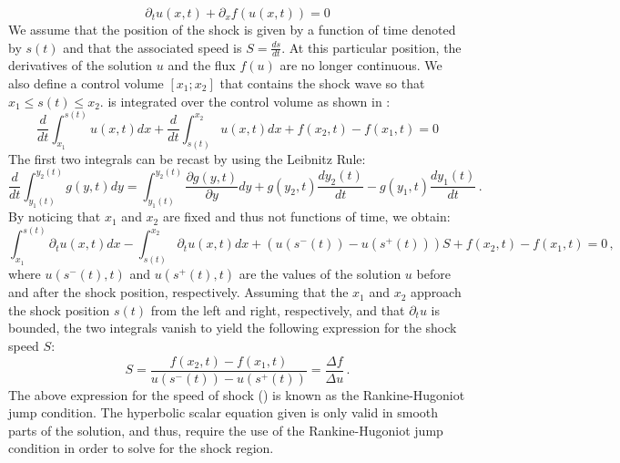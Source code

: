 %
\begin{equation}\label{eq:rh_sct1b}
\partial_t u(x,t) + \partial_x f(u(x,t)) = 0
\end{equation}
%
We assume that the position of the shock is given by a function of time denoted by $s(t)$ and that the associated speed is $S = \frac{ds}{dt}$. At this particular position, the derivatives of the solution $u$ and the flux $f(u)$ are no longer continuous. We also define a control volume $\left[ x_1; x_2 \right]$ that contains the shock wave so that $x_1 \leq s(t) \leq x_2$.  is integrated over the control volume as shown in :
%
\begin{equation}\label{eq:rh2_sct1b}
\frac{d}{dt} \int_{x_1}^{s(t)} u(x,t) dx + \frac{d}{dt} \int_{s(t)}^{x_2} u(x,t) dx + f(x_2,t) - f(x_1,t) = 0
\end{equation}
% 
The first two integrals can be recast by using the Leibnitz Rule:
%
\begin{equation}\label{eq:rh3_sct1b}
\frac{d}{dt} \int_{y_1(t)}^{y_2(t)} g(y,t) dy =  \int_{y_1(t)}^{y_2(t)} \frac{\partial g(y,t)}{\partial y} dy + g(y_2,t) \frac{d y_2(t)}{dt} - g(y_1,t) \frac{d y_1(t)}{dt} \,.
\end{equation}
% 
By noticing that $x_1$ and $x_2$ are fixed and thus not functions of time, we obtain:
%
\begin{equation}\label{eq:rh4_sct1b}
\int_{x_1}^{s(t)} \partial_t u(x,t) dx - \int_{s(t)}^{x_2} \partial_t u(x,t) dx + \left( u(s^-(t)) - u(s^+(t)) \right) S + f(x_2,t) - f(x_1,t) = 0 \,,
\end{equation}
%
where $u(s^-(t),t)$ and $u(s^+(t),t)$ are the values of the solution $u$ before and after the shock position, respectively. Assuming that the $x_1$ and $x_2$ approach the shock position $s(t)$ from the left and right, respectively, and that $\partial_t u$ is bounded, the two integrals vanish to yield the following expression for the shock speed  $S$:
%
\begin{equation}\label{eq:rh5_sct1b}
S = \frac{f(x_2,t) - f(x_1,t)}{u(s^-(t)) - u(s^+(t))} = \frac{\Delta f}{\Delta u} \,.
\end{equation}
%
The above expression for the speed of shock () is known as the Rankine-Hugoniot jump condition. The hyperbolic scalar equation given  is only valid in smooth parts of the solution, and thus, require the use of the Rankine-Hugoniot jump condition in order to solve for the shock region.   

